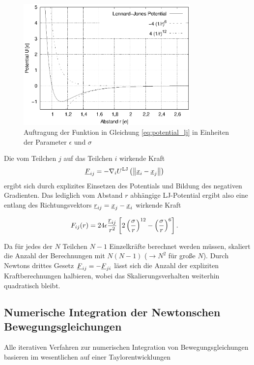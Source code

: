 		\begin{figure}[!ht]
			\centering
			\includegraphics[width=0.8\textwidth]{chapter/main/theory/plt/lennard_jones.eps}
			\caption{Auftragung der Funktion in Gleichung \eqref{eq:potential_lj} in Einheiten
			der Parameter $\epsilon$ und $\sigma$}
			\label{fig:potential_lj}
		\end{figure}

		Die vom Teilchen $j$ auf das Teilchen $i$ wirkende Kraft
		\begin{align}
			\underline{F}_{ij} &= -\nabla_i U^\text{LJ}\left(
				\left\|\underline{x}_i - \underline{x}_j\right\|
			\right)
		\end{align}
		ergibt sich durch explizites Einsetzen des Potentials und Bildung des negativen Gradienten.
		Das lediglich vom Abstand $r$ abhängige LJ-Potential ergibt also eine entlang des
		Richtungsvektors $\underline{r}_{ij} = \underline{x}_j - \underline{x}_i$ wirkende Kraft

		\begin{align}
			F_{ij}(r) &= 24\epsilon \frac{\underline{r}_{ij}}{r^2} \left[
				2\left(\frac{\sigma}{r}\right)^{12}
				-
				\left(\frac{\sigma}{r}\right)^{6}
			\right]
			\label{eq:force_lj}
			.
		\end{align}

		Da für jedes der $N$
		Teilchen $N-1$ Einzelkräfte berechnet werden müssen, skaliert die Anzahl der Berechnungen
		mit $N(N-1)$ ($\rightarrow N^2$ für große $N$). Durch Newtons drittes Gesetz
		$\underline{F}_{ij} = -\underline{F}_{ji}$ lässt sich die Anzahl der expliziten Kraftberechnungen
		halbieren, wobei das Skalierungsverhalten weiterhin quadratisch bleibt.

	\subsection{Numerische Integration der Newtonschen Bewegungsgleichungen}
		Alle iterativen Verfahren zur numerischen Integration von Bewegungsgleichungen basieren
		im wesentlichen auf einer Taylorentwicklungen

